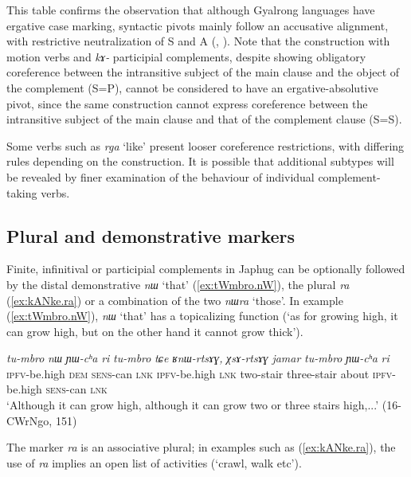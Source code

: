 \documentclass[oneside,a4paper,11pt]{article}
\newcommand{\ipa}[1]{\textit{\phon#1}}
\newcommand{\jpg}[2]{\ipa{#1} `#2'}
\begin{document}
This table confirms the observation that although Gyalrong languages have ergative case marking, syntactic pivots mainly follow an accusative alignment, with restrictive neutralization of S and A (\citealt[275]{vanvalin97syntax}, \citealt{jackson03caodeng, jacques16relatives}). Note that the construction with motion verbs and \ipa{kɤ-} participial complements, despite showing obligatory coreference between the intransitive subject of the main clause and the object of the complement (S=P), cannot be considered to have an ergative-absolutive pivot, since the same construction cannot express coreference between the intransitive subject of the main clause and that of the complement clause (S=S).

Some verbs such as \jpg{rga}{like} present looser coreference restrictions, with differing rules depending on the construction. It is possible that additional subtypes will be revealed by finer examination of the behaviour of individual complement-taking verbs.

 \subsection{Plural and demonstrative markers} \label{sec:demonstratives}
Finite, infinitival or participial complements in Japhug can be optionally followed by the distal demonstrative \jpg{nɯ}{that} (\ref{ex:tWmbro.nW}), the plural \ipa{ra} (\ref{ex:kANke.ra}) or a combination of the two \jpg{nɯra}{those}. In example (\ref{ex:tWmbro.nW}), \jpg{nɯ}{that}  has a topicalizing function (`as for growing high, it can grow high, but on the other hand it cannot grow thick').

 \begin{exe}
\ex \label{ex:tWmbro.nW}
\gll 
\ipa{tu-mbro} 	\ipa{nɯ} 	\ipa{ɲɯ-cʰa} 	\ipa{ri} 	\ipa{tu-mbro} 	\ipa{tɕe} 	\ipa{ʁnɯ-rtsɤɣ,} 	\ipa{χsɤ-rtsɤɣ} 	\ipa{jamar} 	\ipa{tu-mbro} 	\ipa{ɲɯ-cʰa} 	\ipa{ri}  \\
\textsc{ipfv}-be.high \textsc{dem} \textsc{sens}-can \textsc{lnk} \textsc{ipfv}-be.high \textsc{lnk} two-stair three-stair about \textsc{ipfv}-be.high  \textsc{sens}-can \textsc{lnk} \\
\glt `Although it can grow high, although it can grow two or three stairs high,...' (16-CWrNgo, 151)
\end{exe}
 
The marker \ipa{ra} is an associative plural; in examples such as (\ref{ex:kANke.ra}), the use of \ipa{ra} implies an open list of activities (`crawl, walk etc'). 
 
\end{document}
